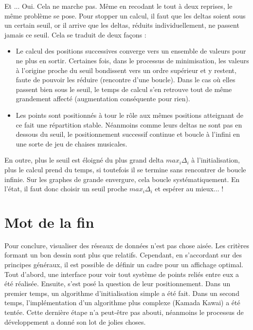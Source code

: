 \documentclass[a4paper,12pt]{article}
\begin{document}
Et ... Oui. Cela ne marche pas. Même en recodant le tout à deux reprises, le même problème se pose. Pour stopper un calcul, il faut que les deltas soient sous un certain seuil, or il arrive que les deltas, réduits individuellement, ne passent jamais ce seuil. Cela se traduit de deux façons :

\begin{itemize}
  \item Le calcul des positions successives converge vers un ensemble de valeurs pour ne plus en sortir. Certaines fois, dans le processus de minimisation, les valeurs à l’origine proche du seuil bondissent vers un ordre supérieur et y restent, faute de pouvoir les réduire (rencontre d’une boucle). Dans le cas où elles passent bien sous le seuil, le temps de calcul s’en retrouve tout de même grandement affecté (augmentation conséquente pour rien).
  \item Les points sont positionnés à tour le rôle aux mêmes positions atteignant de ce fait une répartition stable. Néanmoins comme leurs deltas ne sont pas en dessous du seuil, le positionnement successif continue et boucle à l’infini en une sorte de jeu de chaises musicales.
\end{itemize}

En outre, plus le seuil est éloigné du plus grand delta $max_i \Delta_i$ à l’initialisation, plus le calcul prend du temps, si toutefois il se termine sans rencontrer de boucle infinie. Sur les graphes de grande envergure, cela boucle systématiquement. En l’état, il faut donc choisir un seuil proche $max_i \Delta_i$ et espérer au mieux... !

\section{Mot de la fin}

Pour conclure, visualiser des réseaux de données n’est pas chose aisée. Les critères formant un bon dessin sont plus que relatifs. Cependant, en s’accordant sur des principes généraux, il est possible de définir un cadre pour un affichage optimal.
Tout d’abord, une interface pour voir tout système de points reliés entre eux a été réalisée. Ensuite, s’est posé la question de leur positionnement. Dans un premier temps, un algorithme d’initialisation simple a été fait. Dans un second temps, l’implémentation d’un algorithme plus complexe (Kamada Kawai) a été tentée. Cette dernière étape n’a peut-être pas abouti, néanmoins le processus de développement a donné son lot de jolies choses.
\end{document}
